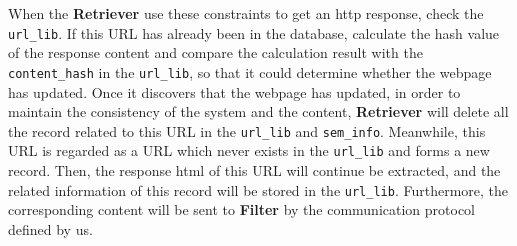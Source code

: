\begin{table}[htb!]
\small
\centering
\caption{Crawler Constraints}
\label{tab:crawler_constraints}
\end{table}

When the \textbf{Retriever} use these constraints to get an http response, check the \texttt{url\_lib}. If this URL has already been in the database, calculate the hash value of the response content and compare the calculation result with the \texttt{content\_hash} in the \texttt{url\_lib}, so that it could determine whether the webpage has updated. Once it discovers that the webpage has updated, in order to maintain the consistency of the system and the content, \textbf{Retriever} will delete all the record related to this URL in the \texttt{url\_lib} and \texttt{sem\_info}. Meanwhile, this URL is regarded as a URL which never exists in the \texttt{url\_lib} and forms a new record. Then, the response html of this URL will continue be extracted, and the related information of this record will be stored in the \texttt{url\_lib}. Furthermore, the corresponding content will be sent to \textbf{Filter} by the communication protocol defined by us.

